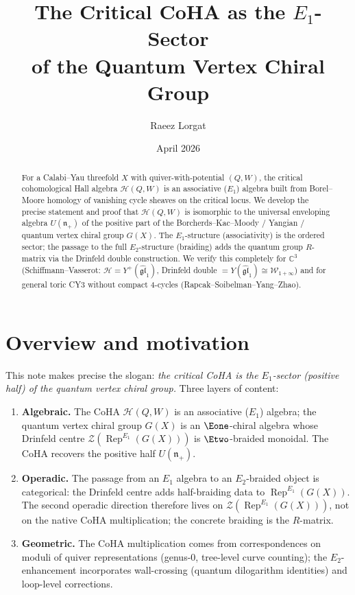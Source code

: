 \documentclass[11pt]{article}
\title{The Critical CoHA as the $E_1$-Sector\\
of the Quantum Vertex Chiral Group}
\author{Raeez Lorgat}
\date{April 2026}
\theoremstyle{definition}
\theoremstyle{remark}
\newcommand{\CC}{\mathbb{C}}
\newcommand{\Rep}{\operatorname{Rep}}
\newcommand{\CoHA}{\mathcal{H}}
\newcommand{\cZ}{\mathcal{Z}}
\newcommand{\cW}{\mathcal{W}}
\newcommand{\frakn}{\mathfrak{n}}
\newcommand{\gl}{\mathfrak{gl}}
\begin{document}
\maketitle

\begin{abstract}
For a Calabi--Yau threefold $X$ with quiver-with-potential $(Q,W)$, the critical
cohomological Hall algebra $\CoHA(Q,W)$ is an associative ($E_1$) algebra built from
Borel--Moore homology of vanishing cycle sheaves on the critical locus. We develop
the precise statement and proof that $\CoHA(Q,W)$ is isomorphic to the universal
enveloping algebra $U(\frakn_+)$ of the positive part of the Borcherds--Kac--Moody /
Yangian / quantum vertex chiral group $G(X)$. The $E_1$-structure (associativity)
is the ordered sector; the passage to the full $E_2$-structure (braiding) adds the
quantum group $R$-matrix via the Drinfeld double construction. We verify this
completely for $\CC^3$ (Schiffmann--Vasserot: $\CoHA = Y^+(\widehat{\gl}_1)$,
Drinfeld double $= Y(\widehat{\gl}_1) \cong \cW_{1+\infty}$) and for general toric
CY3 without compact 4-cycles (Rapcak--Soibelman--Yang--Zhao).
\end{abstract}

\tableofcontents

\section{Overview and motivation}
\label{sec:overview}

This note makes precise the slogan: \emph{the critical CoHA is the $E_1$-sector (positive half) of the quantum vertex chiral group.} Three layers of content:

\begin{enumerate}[label=(\alph*)]
 \item \textbf{Algebraic.} The CoHA $\CoHA(Q,W)$ is an associative ($E_1$)
 algebra; the quantum vertex chiral group $G(X)$ is an $\Eone$-chiral
 algebra whose Drinfeld centre $\cZ(\Rep^{E_1}(G(X)))$ is $\Etwo$-braided
 monoidal. The CoHA recovers the
 positive half $U(\frakn_+)$.
 \item \textbf{Operadic.} The passage from an $E_1$ algebra to an
 $E_2$-braided object is categorical: the Drinfeld centre adds
 half-braiding data to $\Rep^{E_1}(G(X))$. The second operadic
 direction therefore lives on $\cZ(\Rep^{E_1}(G(X)))$, not on the
 native CoHA multiplication; the concrete braiding is the $R$-matrix.
 \item \textbf{Geometric.} The CoHA multiplication comes from correspondences
 on moduli of quiver representations (genus-0, tree-level curve counting);
 the $E_2$-enhancement incorporates wall-crossing (quantum dilogarithm
 identities) and loop-level corrections.
\end{enumerate}
\end{document}

